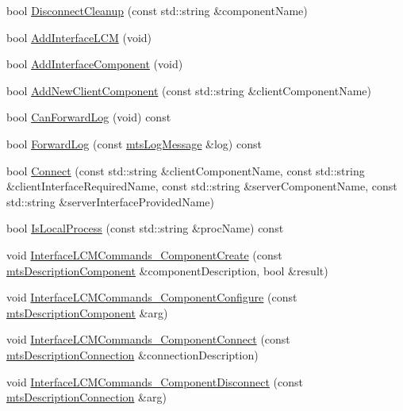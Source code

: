 \begin{DoxyCompactItemize}
\item 
bool \hyperlink{classmts_manager_component_client_a247fc2e5e3114a0968b81294d0e07efb}{Disconnect\-Cleanup} (const std\-::string \&component\-Name)
\item 
bool \hyperlink{classmts_manager_component_client_a5276a53ae1b4afeec79205cf2e642d5f}{Add\-Interface\-L\-C\-M} (void)
\item 
bool \hyperlink{classmts_manager_component_client_a655496f61e6fe26b83fa6b3aec5cbc29}{Add\-Interface\-Component} (void)
\item 
bool \hyperlink{classmts_manager_component_client_a8145aeb56a32dbfc6b8b0646054c3c82}{Add\-New\-Client\-Component} (const std\-::string \&client\-Component\-Name)
\item 
bool \hyperlink{classmts_manager_component_client_a71e559190d77acb80c5421ff3588a0d7}{Can\-Forward\-Log} (void) const 
\item 
bool \hyperlink{classmts_manager_component_client_af97b807f51afb47dded13b9bfb78163e}{Forward\-Log} (const \hyperlink{classmts_log_message}{mts\-Log\-Message} \&log) const 
\item 
bool \hyperlink{classmts_manager_component_client_a69595c3e1cac7926dc094424faab283e}{Connect} (const std\-::string \&client\-Component\-Name, const std\-::string \&client\-Interface\-Required\-Name, const std\-::string \&server\-Component\-Name, const std\-::string \&server\-Interface\-Provided\-Name)
\item 
bool \hyperlink{classmts_manager_component_client_a7b8ecbd2a06ed59f5381f55977c021da}{Is\-Local\-Process} (const std\-::string \&proc\-Name) const 
\item 
void \hyperlink{classmts_manager_component_client_a6634914815df194f57df1b51c3ecce4a}{Interface\-L\-C\-M\-Commands\-\_\-\-Component\-Create} (const \hyperlink{classmts_description_component}{mts\-Description\-Component} \&component\-Description, bool \&result)
\item 
void \hyperlink{classmts_manager_component_client_aef47087651c91c346ebedf468874fdc7}{Interface\-L\-C\-M\-Commands\-\_\-\-Component\-Configure} (const \hyperlink{classmts_description_component}{mts\-Description\-Component} \&arg)
\item 
void \hyperlink{classmts_manager_component_client_a510cba33ccd436b1ac56aeb338718c8c}{Interface\-L\-C\-M\-Commands\-\_\-\-Component\-Connect} (const \hyperlink{classmts_description_connection}{mts\-Description\-Connection} \&connection\-Description)
\item 
void \hyperlink{classmts_manager_component_client_afc1fc4c05f0bc594d9eace2499dbb98b}{Interface\-L\-C\-M\-Commands\-\_\-\-Component\-Disconnect} (const \hyperlink{classmts_description_connection}{mts\-Description\-Connection} \&arg)

\end{DoxyCompactItemize}
